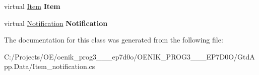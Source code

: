 \begin{DoxyCompactItemize}
virtual \mbox{\hyperlink{class_gtd_app_1_1_data_1_1_item}{Item}} {\bfseries Item}
\item 
\mbox{\label{class_gtd_app_1_1_data_1_1_item__notification_a66bf193a5fd35bf282336a961cc32584}} 
virtual \mbox{\hyperlink{class_gtd_app_1_1_data_1_1_notification}{Notification}} {\bfseries Notification}
\end{DoxyCompactItemize}


The documentation for this class was generated from the following file\+:\begin{DoxyCompactItemize}
\item 
C\+:/\+Projects/\+O\+E/oenik\+\_\+prog3\+\_\+\_\+\_\+ep7d0o/\+O\+E\+N\+I\+K\+\_\+\+P\+R\+O\+G3\+\_\+\_\+\_\+\+E\+P7\+D0\+O/\+Gtd\+App.\+Data/Item\+\_\+notification.\+cs\end{DoxyCompactItemize}
